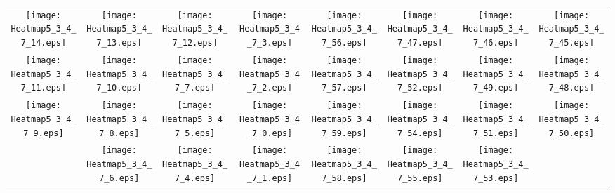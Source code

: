 \documentclass{standalone}
\begin{document}
\begin{tabular}{ *8{c} }
\texttt{[image: Heatmap5\_3\_4\_7\_14.eps]} & \texttt{[image: Heatmap5\_3\_4\_7\_13.eps]} & \texttt{[image: Heatmap5\_3\_4\_7\_12.eps]} & \texttt{[image: Heatmap5\_3\_4\_7\_3.eps]} & \texttt{[image: Heatmap5\_3\_4\_7\_56.eps]} & \texttt{[image: Heatmap5\_3\_4\_7\_47.eps]} & \texttt{[image: Heatmap5\_3\_4\_7\_46.eps]} & \texttt{[image: Heatmap5\_3\_4\_7\_45.eps]} \\
\texttt{[image: Heatmap5\_3\_4\_7\_11.eps]} & \texttt{[image: Heatmap5\_3\_4\_7\_10.eps]} & \texttt{[image: Heatmap5\_3\_4\_7\_7.eps]} & \texttt{[image: Heatmap5\_3\_4\_7\_2.eps]} & \texttt{[image: Heatmap5\_3\_4\_7\_57.eps]} & \texttt{[image: Heatmap5\_3\_4\_7\_52.eps]} & \texttt{[image: Heatmap5\_3\_4\_7\_49.eps]} & \texttt{[image: Heatmap5\_3\_4\_7\_48.eps]} \\
\texttt{[image: Heatmap5\_3\_4\_7\_9.eps]} & \texttt{[image: Heatmap5\_3\_4\_7\_8.eps]} & \texttt{[image: Heatmap5\_3\_4\_7\_5.eps]} & \texttt{[image: Heatmap5\_3\_4\_7\_0.eps]} & \texttt{[image: Heatmap5\_3\_4\_7\_59.eps]} & \texttt{[image: Heatmap5\_3\_4\_7\_54.eps]} & \texttt{[image: Heatmap5\_3\_4\_7\_51.eps]} & \texttt{[image: Heatmap5\_3\_4\_7\_50.eps]} \\
 & \texttt{[image: Heatmap5\_3\_4\_7\_6.eps]} & \texttt{[image: Heatmap5\_3\_4\_7\_4.eps]} & \texttt{[image: Heatmap5\_3\_4\_7\_1.eps]} & \texttt{[image: Heatmap5\_3\_4\_7\_58.eps]} & \texttt{[image: Heatmap5\_3\_4\_7\_55.eps]} & \texttt{[image: Heatmap5\_3\_4\_7\_53.eps]} &  
\end{tabular}
\end{document}
